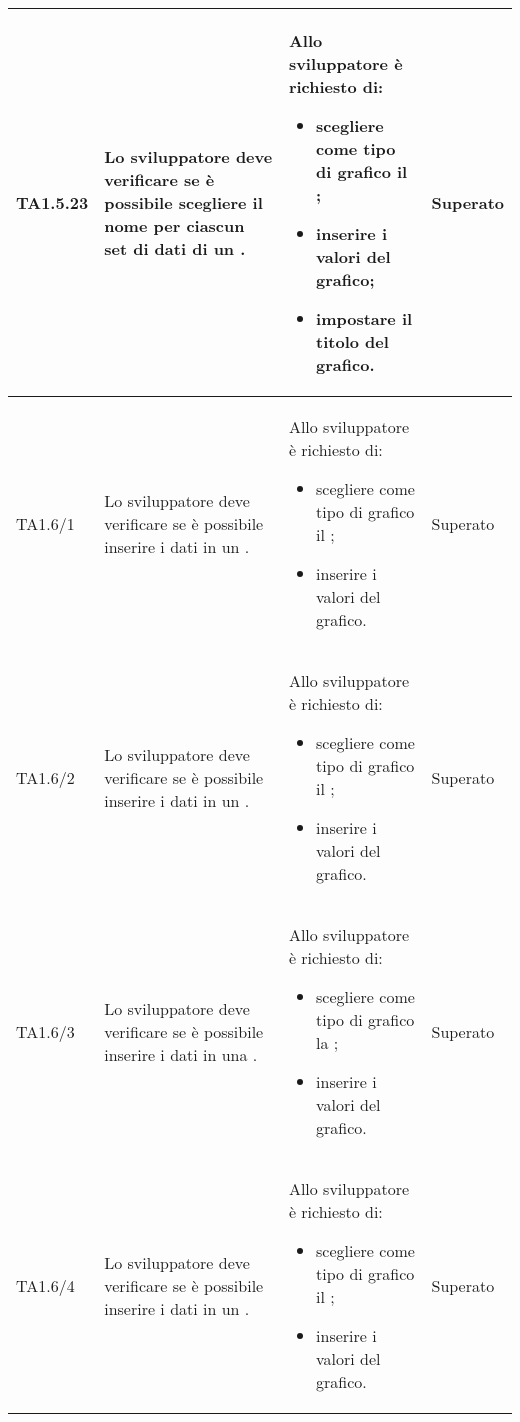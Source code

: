 \begin{longtabu}{| X[0.5] | X | X | X[0.5] |}
	TA1.5.23 & Lo sviluppatore deve verificare se è possibile scegliere il nome per ciascun set di dati di un .

		& Allo sviluppatore è richiesto di:
		\begin{itemize}
			\item scegliere come tipo di grafico il ;
			\item inserire i valori del grafico;
			\item impostare il titolo del grafico.
		\end{itemize}
& Superato \\ \hline

	TA1.6/1 & Lo sviluppatore deve verificare se è possibile inserire i dati in un .

		& Allo sviluppatore è richiesto di:
		\begin{itemize}
			\item scegliere come tipo di grafico il ;
			\item inserire i valori del grafico.
		\end{itemize}
& Superato \\ \hline	
			
	TA1.6/2 & Lo sviluppatore deve verificare se è possibile inserire i dati in un .

		& Allo sviluppatore è richiesto di:
		\begin{itemize}
			\item scegliere come tipo di grafico il ;
			\item inserire i valori del grafico.
		\end{itemize}
& Superato \\ \hline	

	TA1.6/3 & Lo sviluppatore deve verificare se è possibile inserire i dati in una .

		& Allo sviluppatore è richiesto di:
		\begin{itemize}
			\item scegliere come tipo di grafico la ;
			\item inserire i valori del grafico.
		\end{itemize}
& Superato \\ \hline	

	TA1.6/4 & Lo sviluppatore deve verificare se è possibile inserire i dati in un .

		& Allo sviluppatore è richiesto di:
		\begin{itemize}
			\item scegliere come tipo di grafico il ;
			\item inserire i valori del grafico.
		\end{itemize}
& Superato \\ \hline


\end{longtabu}
